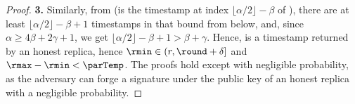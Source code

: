 \begin{proof}
		\textbf{3.} Similarly, from  (\rmin is the timestamp at index $\lfloor \alpha / 2 \rfloor - \beta$ of \txVotes), there are at least $\lfloor \alpha / 2 \rfloor - \beta + 1$ timestamps in \txVotes that bound \rmin from below, and, since $\alpha \geq 4\beta + 2 \gamma + 1$, we get $\lfloor \alpha / 2 \rfloor - \beta + 1 > \beta + \gamma$.
		Hence, \rmin is a timestamp returned by an honest replica, hence $\rmin \in (r, \round + \delta]$ and $\rmax - \rmin < \parTemp$.
	The proofs hold except with negligible probability, as the adversary can forge a signature under the public key of an honest replica with a negligible probability.
\end{proof}
